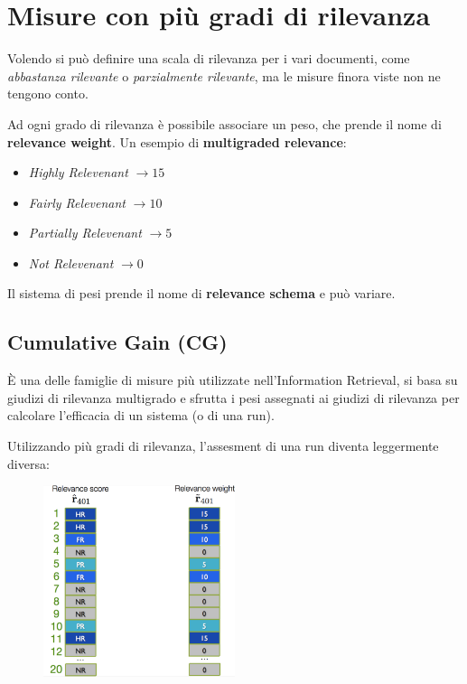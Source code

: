 

\section{Misure con più gradi di rilevanza}

Volendo si può definire una scala di rilevanza per i vari documenti, come \textit{abbastanza rilevante} o \textit{parzialmente rilevante}, ma le misure finora viste non ne tengono conto.

Ad ogni grado di rilevanza è possibile associare un peso, che prende il nome di \textbf{relevance weight}. Un esempio di \textbf{multigraded relevance}:

\begin{itemize}
	\item \textit{Highly Relevenant} $\to 15$
	\item \textit{Fairly Relevenant} $\to 10$
	\item \textit{Partially Relevenant} $\to 5$
	\item \textit{Not Relevenant} $\to 0$
\end{itemize}

\noindent Il sistema di pesi prende il nome di \textbf{relevance schema} e può variare.

\subsection{Cumulative Gain (CG)}

\`E una delle famiglie di misure più utilizzate nell'Information Retrieval, si basa su giudizi di rilevanza multigrado e sfrutta i pesi assegnati ai giudizi di rilevanza per calcolare l'efficacia di un sistema (o di una run).

Utilizzando più gradi di rilevanza, l'assesment di una run diventa leggermente diversa:

\begin{figure}[htbp]
	\centering
	\includegraphics[width=0.5\textwidth]{images/l16-fig-1.png}
\end{figure}

